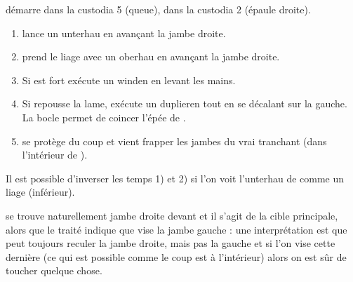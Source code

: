 \begin{technique}[Liegniczer 2]
\A démarre dans la custodia 5 (queue), \D dans la custodia 2 (épaule droite).

\begin{enumerate}
	\item \A lance un unterhau en avançant la jambe droite.
	
	\item \D prend le liage avec un oberhau en avançant la jambe droite.
	
	\item {}
		Si \D est fort \A exécute un winden en levant les mains.
	
	\item {}
		Si \D repousse la lame, \A exécute un duplieren tout en se décalant sur la gauche.
		La bocle permet de coincer l'épée de \D.
	
	\item \D se protège du coup et \A vient frapper les jambes du vrai tranchant (dans l'intérieur de \D).
\end{enumerate}

Il est possible d'inverser les temps 1) et 2) si l'on voit l'unterhau de \A comme un liage (inférieur).

\D se trouve naturellement jambe droite devant et il s'agit de la cible principale, alors que le traité indique que \A vise la jambe gauche : une interprétation est que \D peut toujours reculer la jambe droite, mais pas la gauche et si l'on vise cette dernière (ce qui est possible comme le coup est à l'intérieur) alors on est sûr de toucher quelque chose.

\end{technique}




